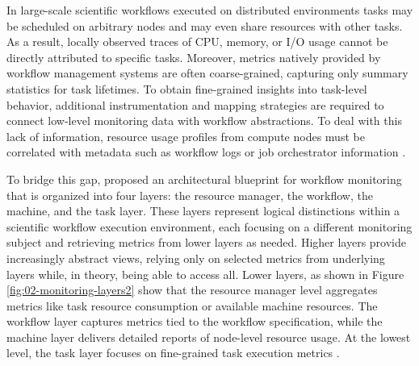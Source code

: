 In large-scale scientific workflows executed on distributed environments tasks may be scheduled on arbitrary nodes and may even share resources with other tasks. As a result, locally observed traces of CPU, memory, or I/O usage cannot be directly attributed to specific tasks. Moreover, metrics natively provided by workflow management systems are often coarse-grained, capturing only summary statistics for task lifetimes. To obtain fine-grained insights into task-level behavior, additional instrumentation and mapping strategies are required to connect low-level monitoring data with workflow abstractions. To deal with this lack of information, resource usage profiles from compute nodes must be correlated with metadata such as workflow logs or job orchestrator information \cite{Witzke2024} \cite{Bader_2022}.

To bridge this gap, \cite{Bader_2022} proposed an architectural blueprint for workflow monitoring that is organized into four layers: the resource manager, the workflow, the machine, and the task layer. These layers represent logical distinctions within a scientific workflow execution environment, each focusing on a different monitoring subject and retrieving metrics from lower layers as needed. Higher layers provide increasingly abstract views, relying only on selected metrics from underlying layers while, in theory, being able to access all. Lower layers, as shown in Figure \ref{fig:02-monitoring-layers2} show that the resource manager level aggregates metrics like task resource consumption or available machine resources. The workflow layer captures metrics tied to the workflow specification, while the machine layer delivers detailed reports of node-level resource usage. At the lowest level, the task layer focuses on fine-grained task execution metrics \cite{Bader_2022}.

